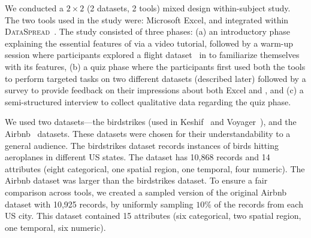  We conducted a $2 \times 2$ (2 datasets, 2 tools) mixed design within-subject study. The two tools used in the study were: Microsoft Excel, and \noah integrated within {\scshape DataSpread}~\cite{dataspread}. 
The study consisted of three phases: (a) an introductory phase explaining
the essential features of \noah via a video tutorial, followed by a warm-up session where participants explored a flight dataset~\cite{web:flight} in \noah 
to familiarize themselves with its features,
(b) a quiz phase where the participants first used both the tools
to perform targeted tasks on two different datasets (described later) 
followed by a survey to provide feedback on their impressions about both Excel and \noah, and
(c) a semi-structured interview to collect qualitative data regarding the quiz phase. 

 We used two datasets---the birdstrikes (used in Keshif~\cite{yalccin2018keshif} and Voyager~\cite{wongsuphasawat2016voyager}), and the Airbnb~\cite{web:airbnb} datasets. These datasets were chosen for their understandability to a general audience. The birdstrikes dataset records instances of birds hitting aeroplanes in different US states. The dataset has 10,868 records and 14 attributes (eight categorical, one spatial region, one temporal, four numeric). 
The Airbnb dataset was larger than the birdstrikes dataset. To ensure a fair comparison across tools, we created a sampled version of the original Airbnb dataset with 10,925 records, by uniformly sampling $10\%$ of the records from each US city. This dataset contained 15 attributes (six categorical, two spatial region, one temporal, six numeric).


